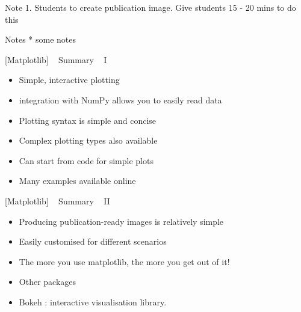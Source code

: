 \documentclass{article}
\begin{document}
    Note 1. Students to create publication image. Give students 15 - 20 mins
to do this

    Notes * some notes

    {[}Matplotlib{]} ~ Summary ~ I

\begin{itemize}
\item
  Simple, interactive plotting
\item
  integration with NumPy allows you to easily read data
\item
  Plotting syntax is simple and concise
\item
  Complex plotting types also available
\item
  Can start from code for simple plots
\item
  Many examples available online
\end{itemize}

    {[}Matplotlib{]} ~ Summary ~ II

\begin{itemize}
\item
  Producing publication-ready images is relatively simple
\item
  Easily customised for different scenarios
\item
  The more you use matplotlib, the more you get out of it!
\item
  Other packages
\item
  Bokeh : interactive visualisation library.
\end{itemize}


    
    
    
    
\end{document}
